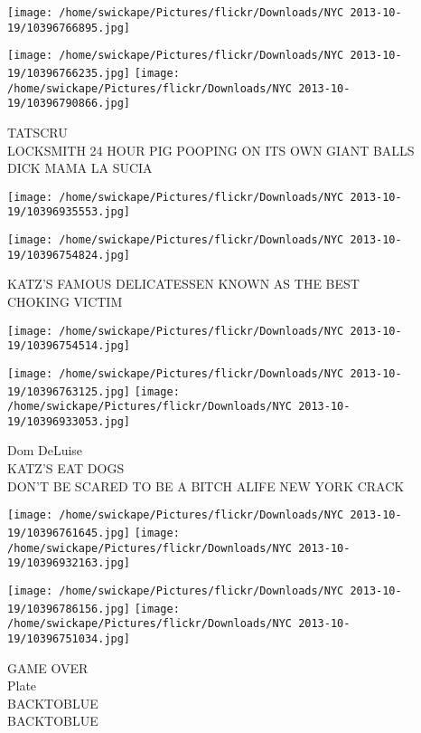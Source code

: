 \documentclass[10pt,letterpaper]{article}
\begin{document}
\texttt{[image: /home/swickape/Pictures/flickr/Downloads/NYC 2013-10-19/10396766895.jpg]}

\vspace{0.25in}
\texttt{[image: /home/swickape/Pictures/flickr/Downloads/NYC 2013-10-19/10396766235.jpg]}
\texttt{[image: /home/swickape/Pictures/flickr/Downloads/NYC 2013-10-19/10396790866.jpg]}

TATSCRU\\
LOCKSMITH 24 HOUR PIG POOPING ON ITS OWN GIANT BALLS\\
DICK MAMA LA SUCIA\\
\pagebreak

\texttt{[image: /home/swickape/Pictures/flickr/Downloads/NYC 2013-10-19/10396935553.jpg]}

\vspace{0.25in}
\texttt{[image: /home/swickape/Pictures/flickr/Downloads/NYC 2013-10-19/10396754824.jpg]}

KATZ'S FAMOUS DELICATESSEN KNOWN AS THE BEST\\
CHOKING VICTIM\\
\pagebreak

\texttt{[image: /home/swickape/Pictures/flickr/Downloads/NYC 2013-10-19/10396754514.jpg]}

\vspace{0.25in}
\texttt{[image: /home/swickape/Pictures/flickr/Downloads/NYC 2013-10-19/10396763125.jpg]}
\texttt{[image: /home/swickape/Pictures/flickr/Downloads/NYC 2013-10-19/10396933053.jpg]}

Dom DeLuise\\
KATZ'S EAT DOGS\\
DON'T BE SCARED TO BE A BITCH ALIFE NEW YORK CRACK\\
\pagebreak

\texttt{[image: /home/swickape/Pictures/flickr/Downloads/NYC 2013-10-19/10396761645.jpg]}
\texttt{[image: /home/swickape/Pictures/flickr/Downloads/NYC 2013-10-19/10396932163.jpg]}

\texttt{[image: /home/swickape/Pictures/flickr/Downloads/NYC 2013-10-19/10396786156.jpg]}
\texttt{[image: /home/swickape/Pictures/flickr/Downloads/NYC 2013-10-19/10396751034.jpg]}

GAME OVER\\
Plate\\
BACKTOBLUE\\
BACKTOBLUE\\
\pagebreak
\end{document}
